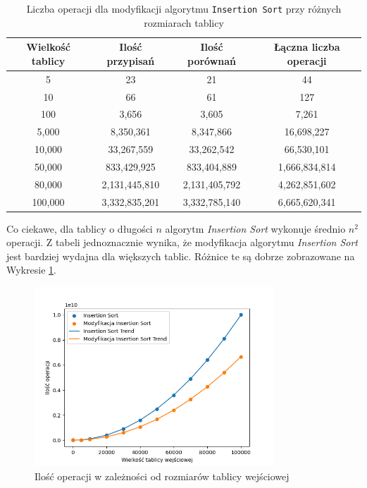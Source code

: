 \documentclass{article}
\begin{document}
\begin{table}[H]
    \centering
    \begin{tabular}{|c|c|c|c|}
    \hline
    \textbf{Wielkość tablicy} & \textbf{Ilość przypisań} & \textbf{Ilość porównań} & \textbf{Łączna liczba operacji} \\ \hline
    5 & 23 & 21 & 44 \\ \hline
    10 & 66 & 61 & 127 \\ \hline
    100 & 3,656 & 3,605 & 7,261 \\ \hline
    5,000 & 8,350,361 & 8,347,866 & 16,698,227 \\ \hline
    10,000 & 33,267,559 & 33,262,542 & 66,530,101 \\ \hline
    50,000 & 833,429,925 & 833,404,889 & 1,666,834,814 \\ \hline
    80,000 & 2,131,445,810 & 2,131,405,792 & 4,262,851,602 \\ \hline
    100,000 & 3,332,835,201 & 3,332,785,140 & 6,665,620,341 \\ \hline
    \end{tabular}
    \caption{Liczba operacji dla modyfikacji algorytmu \texttt{Insertion Sort} przy różnych rozmiarach tablicy}
    \label{tab:m_insertion_results}
\end{table}
Co ciekawe, dla tablicy o długości $n$ algorytm \textit{Insertion Sort} wykonuje średnio $n^2$ operacji. Z tabeli jednoznacznie wynika, że modyfikacja algorytmu \textit{Insertion Sort} jest bardziej wydajna dla większych tablic. Różnice te są dobrze zobrazowane na Wykresie \ref{fig:insertion}.
\begin{figure}[H]
    \centering
    \includegraphics[width=0.8\textwidth]{Figure_1.png}
    \caption{Ilość operacji w zależności od rozmiarów tablicy wejściowej}
    \label{fig:insertion}
\end{figure}
\end{document}
